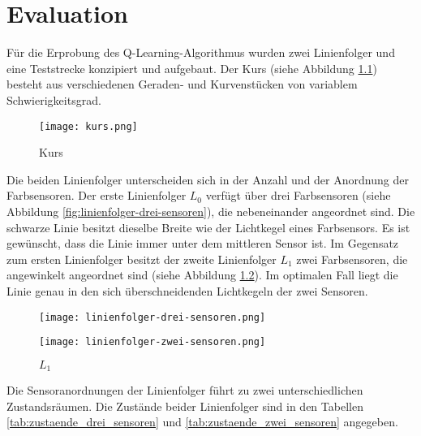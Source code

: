 \chapter{Evaluation} %
\label{cha:evaluation}

Für die Erprobung des Q-Learning-Algorithmus wurden zwei Linienfolger und eine Teststrecke konzipiert und aufgebaut. Der Kurs (siehe Abbildung \ref{fig:kurs}) besteht aus verschiedenen Geraden- und Kurvenstücken von variablem Schwierigkeitsgrad.

\begin{figure}[!htb]
	\centering
	\texttt{[image: kurs.png]}
	\caption{Kurs}
	\label{fig:kurs}
\end{figure}

Die beiden Linienfolger unterscheiden sich in der Anzahl und der Anordnung der Farbsensoren. Der erste Linienfolger $L_0$ verfügt über drei Farbsensoren (siehe Abbildung \ref{fig:linienfolger-drei-sensoren}), die nebeneinander angeordnet sind. Die schwarze Linie besitzt dieselbe Breite wie der Lichtkegel eines Farbsensors. Es ist gewünscht, dass die Linie immer unter dem mittleren Sensor ist. Im Gegensatz zum ersten Linienfolger besitzt der zweite Linienfolger $L_1$ zwei Farbsensoren, die angewinkelt angeordnet sind (siehe Abbildung \ref{fig:linienfolger-zwei-sensoren}). Im optimalen Fall liegt die Linie genau in den sich überschneidenden Lichtkegeln der zwei Sensoren.

\begin{figure}[H]
    \centering
    \begin{minipage}{0.45\textwidth}
        \centering
        \texttt{[image: linienfolger-drei-sensoren.png]}
        \caption{$L_0$}
        \label{fig:linienfolger-drei-sensoren}
    \end{minipage}\hfill
    \begin{minipage}{0.45\textwidth}
        \centering
        \texttt{[image: linienfolger-zwei-sensoren.png]}
        \caption{$L_1$}
        \label{fig:linienfolger-zwei-sensoren}
    \end{minipage}
\end{figure}

Die Sensoranordnungen der Linienfolger führt zu zwei unterschiedlichen Zu\-stands\-räumen. Die Zustände beider Linienfolger sind in den Tabellen \ref{tab:zustaende_drei_sensoren} und \ref{tab:zustaende_zwei_sensoren} angegeben.

